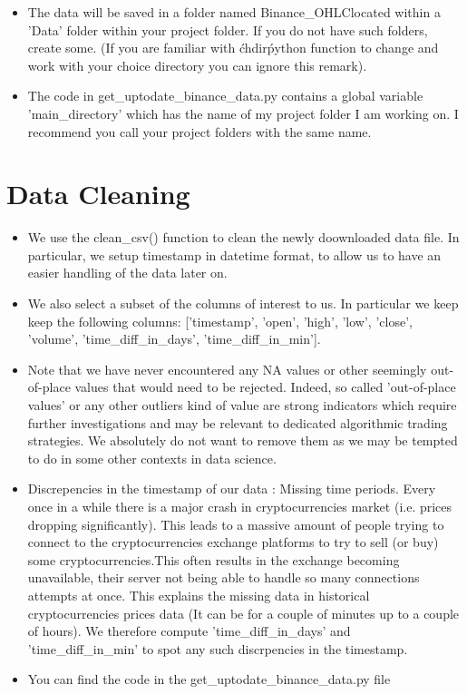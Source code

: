 \documentclass[twoside]{report}
\begin{document}
\begin{spacing}{1}
\begin{itemize}
\item{The data will be saved in a folder named Binance\_OHLC\textquotesingle located within a 'Data' folder within your project folder. If you do not have such folders, create some. (If you are familiar with \'chdir\' python function to change and work with your choice directory you can ignore this remark).}

\item{The code in get\_uptodate\_binance\_data.py contains a global variable 'main_directory' which has the name of my project folder I am working on. I recommend you call your project folders with the same name.}
\end{itemize}


\section{Data Cleaning}

\begin{itemize}
    \item 
We use the clean\_csv() function to clean the newly doownloaded data file. In particular, we setup timestamp in datetime format, to allow us to have an easier handling of the data later on.
    \item
We also select a subset of the columns of interest to us. In particular we keep keep the following columns: ['timestamp', 'open', 'high', 'low', 'close', 'volume', 'time_diff_in_days', 'time_diff_in_min'].
    \item
Note that we have never encountered any NA values or other seemingly out-of-place values that would need to be rejected. Indeed, so called 'out-of-place values' or any other outliers kind of value are strong indicators which require further investigations and may be relevant to dedicated algorithmic trading strategies. We absolutely do not want to remove them as we may be tempted to do in some other contexts in data science.
    \item
Discrepencies in the timestamp of our data : Missing time periods. Every once in a while there is a major crash in cryptocurrencies market (i.e. prices dropping significantly). This leads to a massive amount of people trying to connect to the cryptocurrencies exchange platforms to try to sell (or buy) some cryptocurrencies.This often results in the exchange becoming unavailable, their server not being able to handle so many connections attempts at once. This explains the missing data in historical cryptocurrencies prices data (It can be for a couple of minutes up to a couple of hours). We therefore compute 'time_diff_in_days' and 'time_diff_in_min' to spot any such discrpencies in the timestamp.
    \item
You can find the code in the get_uptodate_binance_data.py file


\end{itemize}
\end{spacing}
\end{document}
